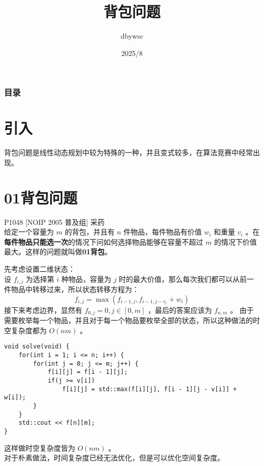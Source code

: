 \documentclass{beamer}
\title{背包问题}
\author{dbywsc}
\date{2025/8}
\newcommand{\fdf}[1]{\alert{\textbf{#1}}}
\begin{document}
\frame{\titlepage}
\begin{frame}
	\frametitle{目录}
	\tableofcontents
\end{frame}
\section{引入}
\begin{frame}
背包问题是线性动态规划中较为特殊的一种，并且变式较多，在算法竞赛中经常出现。
\end{frame}
\section{01背包问题}
\begin{frame}
P1048 [NOIP 2005 普及组] 采药 \\ 
给定一个容量为 $m$ 的背包，并且有 $n$ 件物品，每件物品有价值 $w_i$ 和重量 $v_i$ 。在\fdf{每件物品只能选一次}的情况下问如何选择物品能够在容量不超过 $m$ 的情况下价值最大。这样的问题就叫做\fdf{01背包}。
\end{frame}
\begin{frame}
先考虑设置二维状态：\\ 
设 $f_{i, j}$ 为选择第 $i$ 种物品，容量为 $j$ 时的最大价值，那么每次我们都可以从前一件物品中转移过来，所以状态转移方程为：
$$f_{i, j} = \max(f_{i - 1, j}, f_{i - 1, j - v_i} + w_i)$$
接下来考虑边界，显然有 $f_{0, j} = 0, j \in [0, m]$ ，最后的答案应该为 $f_{n, m}$ 。
由于需要枚举每一个物品，并且对于每一个物品要枚举全部的状态，所以这种做法的时空复杂度都为 $O(nm)$ 。
\end{frame}
\begin{frame}[fragile]
\begin{onlyenv}
\begin{verbatim}
void solve(void) {
    for(int i = 1; i <= n; i++) {
        for(int j = 0; j <= m; j++) {
            f[i][j] = f[i - 1][j];
            if(j >= v[i])
                f[i][j] = std::max(f[i][j], f[i - 1][j - v[i]] + w[i]);
        }
    }
    std::cout << f[n][m];
}
\end{verbatim}
\end{onlyenv}
这样做时空复杂度皆为 $O(nm)$ 。\\
对于朴素做法，时间复杂度已经无法优化，但是可以优化空间复杂度。
\end{frame}
\end{document}
